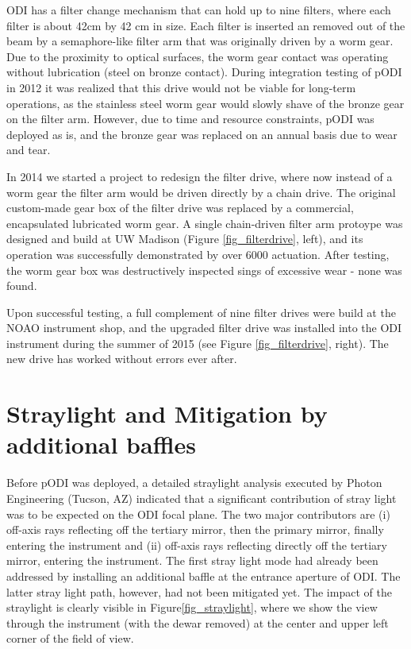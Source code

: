 \documentclass[]{spieman}
\begin{document}
ODI has a filter change mechanism that can hold up to nine filters, where each
filter is about 42cm by 42 cm in size. Each filter is inserted an removed out of
the beam by a semaphore-like filter arm that was originally driven by a worm
gear\cite{Muller2008}. Due to the proximity to optical surfaces, the worm gear
contact was operating without lubrication (steel on bronze contact). 
During integration testing of pODI in 2012 it was realized that this drive would not 
be viable for long-term operations, as the stainless steel worm gear would slowly
shave of the bronze gear on the filter arm. However, due to time and resource
constraints, pODI was deployed as is, and the bronze gear was replaced on an annual basis
due to wear and tear.


In 2014 we  started a project to redesign the filter drive, where now 
instead of a worm gear the filter arm would be driven directly by a chain 
drive. The original custom-made gear box of the filter drive was replaced by a commercial, 
encapsulated lubricated worm gear. A single chain-driven filter arm protoype was designed and build
at UW Madison (Figure \ref{fig_filterdrive}, left), and its operation was  successfully demonstrated 
by  over 6000 actuation. After testing, the worm gear box was destructively inspected sings of 
excessive wear - none  was found. 
 
Upon successful testing, a full complement of nine filter drives were build at 
the NOAO instrument shop, and the upgraded filter drive was installed into the 
ODI instrument during the summer of 2015 (see Figure \ref{fig_filterdrive}, 
right). The new drive has worked without  errors ever after. 



\section{Straylight and Mitigation by additional baffles}

Before pODI was deployed, a detailed straylight analysis executed by Photon Engineering (Tucson, AZ)
indicated that a significant contribution of  stray light was to be expected on the ODI focal plane.
The two major contributors are (i) off-axis rays
reflecting off the tertiary mirror, then the primary mirror, finally entering
the instrument and (ii) off-axis rays reflecting directly off the tertiary mirror,
entering the instrument. The first stray light mode had already been addressed
by installing an additional baffle at the entrance aperture of ODI. The latter
stray light path, however, had not been mitigated yet. The impact of the
straylight is clearly visible in Figure\ref{fig_straylight}, where we show the
view through the instrument (with the dewar removed) at the center and upper left corner of the field of view.
\end{document}
